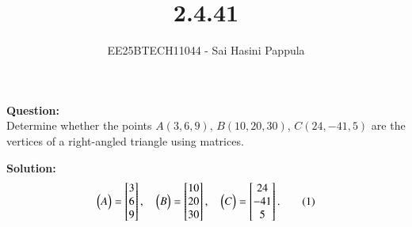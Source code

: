 \documentclass[journal]{IEEEtran}
\begin{document}

\vspace{3cm}

\title{2.4.41}
\author{EE25BTECH11044 - Sai Hasini Pappula}
 \maketitle
{\let\newpage\relax\maketitle}

\renewcommand{\thefigure}{\theenumi}
\renewcommand{\thetable}{\theenumi}
\setlength{\intextsep}{10pt} %


\renewcommand{\thetable}{\theenumi}

\textbf{Question:} \\
Determine whether the points 
$A(3,6,9)$, $B(10,20,30)$, $C(24,-41,5)$
are the vertices of a right-angled triangle using matrices.

\bigskip

\textbf{Solution:} \\

\begin{equation}
\begin{pmatrix}A\end{pmatrix}=\begin{bmatrix}3\\6\\9\end{bmatrix},\quad
\begin{pmatrix}B\end{pmatrix}=\begin{bmatrix}10\\20\\30\end{bmatrix},\quad
\begin{pmatrix}C\end{pmatrix}=\begin{bmatrix}24\\-41\\5\end{bmatrix}.
\tag{1}
\end{equation}
\end{document}
